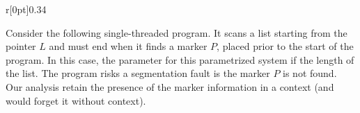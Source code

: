 %
\begin{wrapfigure}{r}[0pt]{0.34\linewidth}
  \hfill%
  
\end{wrapfigure}
%
Consider the following single-threaded program. It scans a list
starting from the pointer $L$ and must end when it finds a marker $P$,
placed prior to the start of the program. %
In this case, the parameter for this parametrized system if the length
of the list.
%
The program risks a segmentation fault is the marker $P$ is not
found. Our analysis retain the presence of the marker information in a
context (and would forget it without context).
